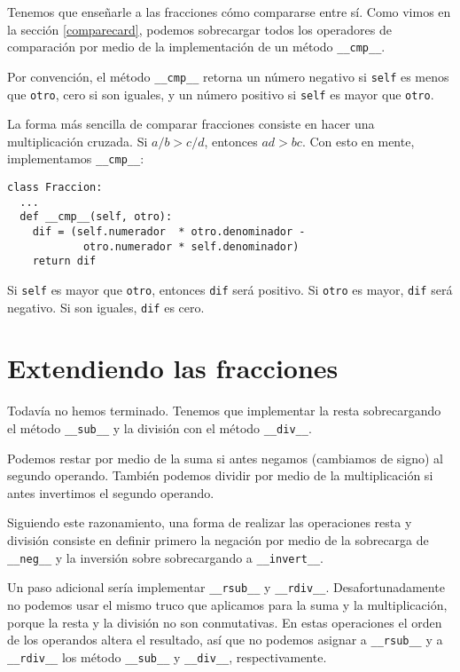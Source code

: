 Tenemos que enseñarle a las fracciones cómo compararse entre sí.
Como vimos en la sección \ref{comparecard}, podemos sobrecargar
todos los operadores de comparación por medio de la implementación
de un método  \texttt{\_\_cmp\_\_}.

Por convención, el método  \texttt{\_\_cmp\_\_} retorna un 
número negativo si  \texttt{self} es menos que \texttt{otro}, cero
si son iguales, y un número positivo si \texttt{self} es 
mayor que  \texttt{otro}.

La forma más sencilla de comparar fracciones consiste en 
hacer una multiplicación cruzada. Si  $a/b > c/d$, entonces $ad > bc$.
Con esto en mente, implementamos \texttt{\_\_cmp\_\_}:

\beforeverb
\begin{verbatim}
class Fraccion:
  ...
  def __cmp__(self, otro):
    dif = (self.numerador  * otro.denominador -
            otro.numerador * self.denominador)
    return dif
\end{verbatim}
\afterverb
%
Si \texttt{self} es mayor que \texttt{otro}, entonces \texttt{dif}
será positivo.  Si \texttt{otro} es mayor, \texttt{dif}
será negativo.  Si son iguales, \texttt{dif} es cero.


\section {Extendiendo las fracciones}

Todavía no hemos terminado. Tenemos que implementar 
la resta sobrecargando el método  \texttt{\_\_sub\_\_} y la
división con el método \texttt{\_\_div\_\_}.

Podemos restar por medio de la suma si antes negamos (cambiamos de 
signo) al segundo operando. También podemos dividir por medio de
la multiplicación si antes invertimos el segundo operando.

Siguiendo este razonamiento, una forma de realizar las operaciones 
resta y división consiste en definir primero la negación por medio 
de la sobrecarga de \texttt{\_\_neg\_\_} y la inversión sobre
sobrecargando a \texttt{\_\_invert\_\_}.

Un paso adicional sería implementar \texttt{\_\_rsub\_\_} y \texttt{\_\_rdiv\_\_}.
Desafortunadamente no podemos usar el mismo truco que aplicamos
para la suma y la multiplicación, porque la resta y la división 
no son conmutativas. En estas operaciones el orden de los operandos
altera el resultado, así que no podemos asignar a \texttt{\_\_rsub\_\_} y 
a \texttt{\_\_rdiv\_\_} los método \texttt{\_\_sub\_\_} y \texttt{\_\_div\_\_},
respectivamente.  

